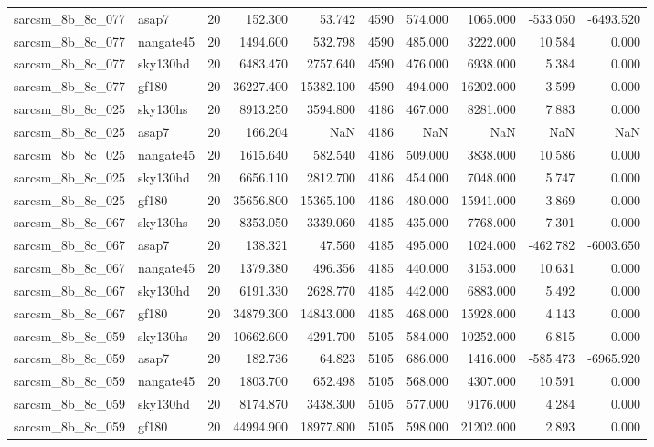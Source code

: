 \begin{longtable}{llrrrrrrrr}
sarcsm\_8b\_8c\_077 & asap7 & 20 & 152.300 & 53.742 & 4590 & 574.000 & 1065.000 & -533.050 & -6493.520 \\
sarcsm\_8b\_8c\_077 & nangate45 & 20 & 1494.600 & 532.798 & 4590 & 485.000 & 3222.000 & 10.584 & 0.000 \\
sarcsm\_8b\_8c\_077 & sky130hd & 20 & 6483.470 & 2757.640 & 4590 & 476.000 & 6938.000 & 5.384 & 0.000 \\
sarcsm\_8b\_8c\_077 & gf180 & 20 & 36227.400 & 15382.100 & 4590 & 494.000 & 16202.000 & 3.599 & 0.000 \\
sarcsm\_8b\_8c\_025 & sky130hs & 20 & 8913.250 & 3594.800 & 4186 & 467.000 & 8281.000 & 7.883 & 0.000 \\
sarcsm\_8b\_8c\_025 & asap7 & 20 & 166.204 & NaN & 4186 & NaN & NaN & NaN & NaN \\
sarcsm\_8b\_8c\_025 & nangate45 & 20 & 1615.640 & 582.540 & 4186 & 509.000 & 3838.000 & 10.586 & 0.000 \\
sarcsm\_8b\_8c\_025 & sky130hd & 20 & 6656.110 & 2812.700 & 4186 & 454.000 & 7048.000 & 5.747 & 0.000 \\
sarcsm\_8b\_8c\_025 & gf180 & 20 & 35656.800 & 15365.100 & 4186 & 480.000 & 15941.000 & 3.869 & 0.000 \\
sarcsm\_8b\_8c\_067 & sky130hs & 20 & 8353.050 & 3339.060 & 4185 & 435.000 & 7768.000 & 7.301 & 0.000 \\
sarcsm\_8b\_8c\_067 & asap7 & 20 & 138.321 & 47.560 & 4185 & 495.000 & 1024.000 & -462.782 & -6003.650 \\
sarcsm\_8b\_8c\_067 & nangate45 & 20 & 1379.380 & 496.356 & 4185 & 440.000 & 3153.000 & 10.631 & 0.000 \\
sarcsm\_8b\_8c\_067 & sky130hd & 20 & 6191.330 & 2628.770 & 4185 & 442.000 & 6883.000 & 5.492 & 0.000 \\
sarcsm\_8b\_8c\_067 & gf180 & 20 & 34879.300 & 14843.000 & 4185 & 468.000 & 15928.000 & 4.143 & 0.000 \\
sarcsm\_8b\_8c\_059 & sky130hs & 20 & 10662.600 & 4291.700 & 5105 & 584.000 & 10252.000 & 6.815 & 0.000 \\
sarcsm\_8b\_8c\_059 & asap7 & 20 & 182.736 & 64.823 & 5105 & 686.000 & 1416.000 & -585.473 & -6965.920 \\
sarcsm\_8b\_8c\_059 & nangate45 & 20 & 1803.700 & 652.498 & 5105 & 568.000 & 4307.000 & 10.591 & 0.000 \\
sarcsm\_8b\_8c\_059 & sky130hd & 20 & 8174.870 & 3438.300 & 5105 & 577.000 & 9176.000 & 4.284 & 0.000 \\
sarcsm\_8b\_8c\_059 & gf180 & 20 & 44994.900 & 18977.800 & 5105 & 598.000 & 21202.000 & 2.893 & 0.000 \\

\end{longtable}
